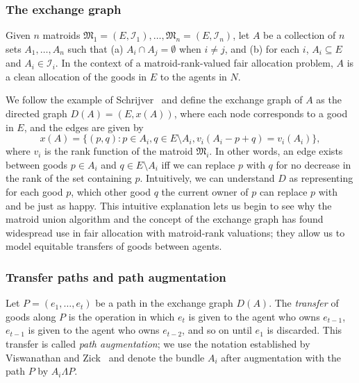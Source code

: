 \subsubsection*{The exchange graph}
Given $n$ matroids $\mathfrak{M}_1 = (E, \mathcal{I}_1),\ldots,\mathfrak{M}_n = (E,\mathcal{I}_n)$, let $A$ be a collection of $n$ sets $A_1,\dots,A_n$ such that (a) $A_i\cap A_j = \emptyset$ when $i\neq j$, and (b) for each $i$, $A_i\subseteq E$ and $A_i\in\mathcal{I}_i$. In the context of a matroid-rank-valued fair allocation problem, $A$ is a clean allocation of the goods in $E$ to the agents in $N$.

We follow the example of Schrijver~\cite{schrijver-2003} and define the exchange graph of $A$ as the directed graph $D(A)=(E, x(A))$, where each node corresponds to a good in $E$, and the edges are given by
$$x(A) = \{ (p,q) : p \in A_i, q \in E\setminus A_i, v_i(A_i - p + q) = v_i(A_i) \},$$
where $v_i$ is the rank function of the matroid $\mathfrak{M}_i$. In other words, an edge exists between goods $p\in A_i$ and $q\in E\setminus A_i$ iff we can replace $p$ with $q$ for no decrease in the rank of the set containing $p$. Intuitively, we can understand $D$ as representing for each good $p$, which other good $q$ the current owner of $p$ can replace $p$ with and be just as happy. This intuitive explanation lets us begin to see why the matroid union algorithm and the concept of the exchange graph has found widespread use in fair allocation with matroid-rank valuations; they allow us to model equitable transfers of goods between agents.

\subsubsection*{Transfer paths and path augmentation}
Let $P = (e_1, \dots, e_t)$ be a path in the exchange graph $D(A)$. The \textit{transfer} of goods along $P$ is the operation in which $e_t$ is given to the agent who owns $e_{t-1}$, $e_{t-1}$ is given to the agent who owns $e_{t-2}$, and so on until $e_1$ is discarded. This transfer is called \textit{path augmentation}; we use the notation established by Viswanathan and Zick~\cite{viswanathan2023yankee} and denote the bundle $A_i$ after augmentation with the path $P$ by $A_i \Lambda P$. 

